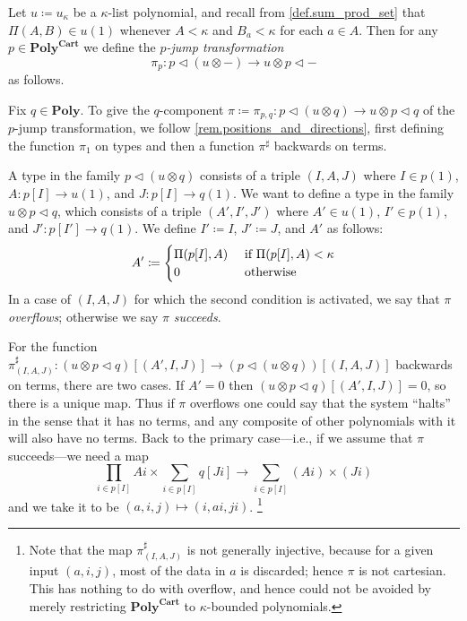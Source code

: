 \documentclass[11pt, one side, article]{memoir}
\theoremstyle{definition}
\theoremstyle{plain}
\newenvironment{definition}
  {\pushQED{\qed}\renewcommand{\qedsymbol}{$\lozenge$}\definitionx}
  {\popQED\enddefinitionx}
\newcommand{\Cat}[1]{\mathbf{#1}}%
\newcommand{\tn}[1]{\textnormal{#1}}
\newcommand{\poly}{\Cat{Poly}}
\newcommand{\polycart}{\poly^{\Cat{Cart}}}
\newcommand{\0}{\textsf{0}}
\newcommand{\1}{\tn{\textsf{1}}}
\newcommand{\tri}{\mathbin{\triangleleft}}
\newcommand{\jump}{\pi}
\begin{document}
\begin{definition}[Jump transformation $\jump$]\label{def.jump}
Let $u\coloneqq u_\kappa$ be a $\kappa$-list polynomial, and recall from \cref{def.sum_prod_set} that $\Pi(A,B)\in u(1)$ whenever $A<\kappa$ and $B_a<\kappa$ for each $a\in A$. Then for any $p\in\polycart$ we define the \emph{$p$-jump transformation}
\[\jump_{p}\colon p\tri(u\otimes -)\to u\otimes p\tri -\]
as follows.

Fix $q\in\poly$. To give the $q$-component $\jump\coloneqq\jump_{p,q}\colon p\tri(u\otimes q)\to u\otimes p\tri q$ of the $p$-jump transformation, we follow \cref{rem.positions_and_directions}, first defining the function $\jump_1$  on types and then a function $\jump^\sharp$ backwards on terms. 

A type in the family $p\tri(u\otimes q)$ consists of a triple $(I,A,J)$ where $I\in p(1)$, $A\colon p[I]\to u(1)$, and $J\colon p[I]\to q(1)$. We want to define a type in the family $u\otimes p\tri q$, which consists of a triple $(A',I',J')$ where $A'\in u(1)$, $I'\in p(1)$, and $J'\colon p[I']\to q(1)$. We define $I'\coloneqq I$, $J'\coloneqq J$, and $A'$ as follows:
\begin{equation}\label{eqn.overflow}
  A'\coloneqq
  \begin{cases}
  	\Pi(p[I],A)&\tn{ if }\Pi(p[I],A)<\kappa\\
		0&\tn{ otherwise}
  \end{cases}
\end{equation}
In a case of $(I,A,J)$ for which the second condition is activated, we say that $\jump$ \emph{overflows}; otherwise we say $\pi$ \emph{succeeds}.

For the function $\jump^\sharp_{(I,A,J)}\colon (u\otimes p\tri q)[(A',I,J)]\to(p\tri(u\otimes q))[(I,A,J)]$ backwards on terms, there are two cases. If $A'=0$ then $(u\otimes p\tri q)[(A',I,J)]=0$, so there is a unique map. Thus if $\pi$ overflows one could say that the system ``halts'' in the sense that it has no terms, and any composite of other polynomials with it will also have no terms. Back to the primary case---i.e., if we assume that $\pi$ succeeds---we need a map
\begin{equation}\label{eqn.not_injective}
\prod_{i\in p[I]}A i\times\sum_{i\in p[I]}q[J i]\to\sum_{i\in p[I]}(A i)\times (J i)
\end{equation}
and we take it to be $(a,i,j)\mapsto(i,a i,j i)$.%
\footnote{Note that the map $\jump^\sharp_{(I,A,J)}$ is not generally injective, because for a given input $(a,i,j)$, most of the data in $a$ is discarded; hence $\jump$ is not cartesian. This has nothing to do with overflow, and hence could not be avoided by merely restricting $\polycart$ to $\kappa$-bounded polynomials.}
\end{definition}
\end{document}
